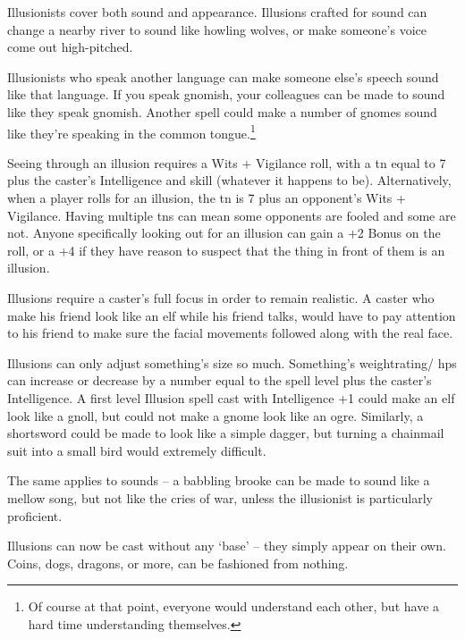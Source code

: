 \begin{multicols}{2}
Illusionists cover both sound and appearance.  Illusions crafted for sound can change a nearby river to sound like howling wolves, or make someone's voice come out high-pitched.

Illusionists who speak another language can make someone else's speech sound like that language.
If you speak gnomish, your colleagues can be made to sound like they speak gnomish.
Another spell could make a number of gnomes sound like they're speaking in the common tongue.\footnote{Of course at that point, everyone would understand each other, but have a hard time understanding themselves.}

Seeing through an illusion requires a Wits + Vigilance roll, with a \gls{tn} equal to 7 plus the caster's Intelligence and skill (whatever it happens to be).  Alternatively, when a player rolls for an illusion, the \gls{tn} is 7 plus an opponent's Wits + Vigilance.  Having multiple \glspl{tn} can mean some opponents are fooled and some are not.  Anyone specifically looking out for an illusion can gain a +2 Bonus on the roll, or a +4 if they have reason to suspect that the thing in front of them is an illusion.

Illusions require a caster's full focus in order to remain realistic.
A caster who make his friend look like an elf while his friend talks, would have to pay attention to his friend to make sure the facial movements followed along with the real face.

Illusions can only adjust something's size so much.
Something's \gls{weightrating}/ \glspl{hp} can increase or decrease by a number equal to the spell level plus the caster's Intelligence.
A first level Illusion spell cast with Intelligence +1 could make an elf look like a gnoll, but could not make a gnome look like an ogre.
Similarly, a shortsword could be made to look like a simple dagger, but turning a chainmail suit into a small bird would extremely difficult.

The same applies to sounds -- a babbling brooke can be made to sound like a mellow song, but not like the cries of war, unless the illusionist is particularly proficient.


Illusions can now be cast without any `base' -- they simply appear on their own.
Coins, dogs, dragons, or more, can be fashioned from nothing.



\end{multicols}
